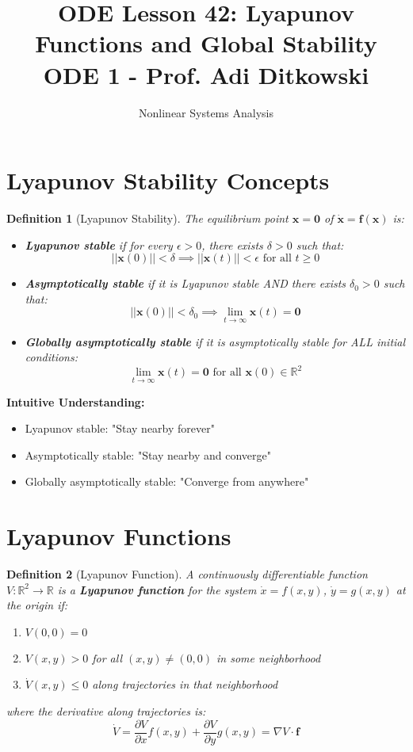 \documentclass[12pt]{article}
\title{ODE Lesson 42: Lyapunov Functions and Global Stability\\
\large ODE 1 - Prof. Adi Ditkowski}
\author{Nonlinear Systems Analysis}
\date{}
\newtheorem{definition}{Definition}
\begin{document}
\maketitle

\section{Lyapunov Stability Concepts}

\begin{definition}[Lyapunov Stability]
The equilibrium point $\mathbf{x} = \mathbf{0}$ of $\dot{\mathbf{x}} = \mathbf{f}(\mathbf{x})$ is:
\begin{itemize}
    \item \textbf{Lyapunov stable} if for every $\epsilon > 0$, there exists $\delta > 0$ such that:
    $$||\mathbf{x}(0)|| < \delta \implies ||\mathbf{x}(t)|| < \epsilon \text{ for all } t \geq 0$$

    \item \textbf{Asymptotically stable} if it is Lyapunov stable AND there exists $\delta_0 > 0$ such that:
    $$||\mathbf{x}(0)|| < \delta_0 \implies \lim_{t \to \infty} \mathbf{x}(t) = \mathbf{0}$$

    \item \textbf{Globally asymptotically stable} if it is asymptotically stable for ALL initial conditions:
    $$\lim_{t \to \infty} \mathbf{x}(t) = \mathbf{0} \text{ for all } \mathbf{x}(0) \in \mathbb{R}^2$$
\end{itemize}
\end{definition}

\begin{keypoint}
\textbf{Intuitive Understanding:}
\begin{itemize}
    \item Lyapunov stable: "Stay nearby forever"
    \item Asymptotically stable: "Stay nearby and converge"
    \item Globally asymptotically stable: "Converge from anywhere"
\end{itemize}
\end{keypoint}

\section{Lyapunov Functions}

\begin{definition}[Lyapunov Function]
A continuously differentiable function $V: \mathbb{R}^2 \to \mathbb{R}$ is a \textbf{Lyapunov function} for the system $\dot{x} = f(x,y)$, $\dot{y} = g(x,y)$ at the origin if:
\begin{enumerate}
    \item $V(0,0) = 0$
    \item $V(x,y) > 0$ for all $(x,y) \neq (0,0)$ in some neighborhood
    \item $\dot{V}(x,y) \leq 0$ along trajectories in that neighborhood
\end{enumerate}
where the derivative along trajectories is:
$$\dot{V} = \frac{\partial V}{\partial x}f(x,y) + \frac{\partial V}{\partial y}g(x,y) = \nabla V \cdot \mathbf{f}$$
\end{definition}
\end{document}
